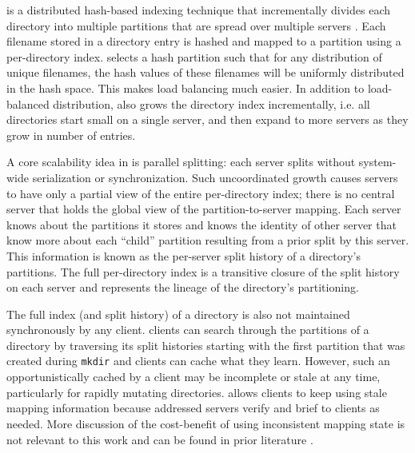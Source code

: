 \giga is a distributed hash-based indexing technique that incrementally
divides each directory into multiple partitions that are spread over multiple
servers \cite{GIGA11}.
Each filename stored in a directory entry is hashed and mapped to a partition
using a per-directory index.
\giga selects a hash partition such that for any distribution of unique filenames,
the hash values of these filenames will be uniformly distributed in the hash space.
This makes load balancing much easier.
In addition to load-balanced distribution, \giga also grows the directory
index incrementally, i.e. all directories start small on a single server, and
then expand to more servers as they grow in number of entries.

A core scalability idea in \giga is parallel splitting: each server splits
without system-wide serialization or synchronization.
Such uncoordinated growth causes \giga servers to have only a partial view of
the entire per-directory index;
there is no central server that holds the global view of the
partition-to-server mapping.
Each server knows about the partitions it stores and knows the
identity of other server that know more about each ``child'' partition
resulting from a prior split by this server.
This information is known as the per-server split history of
a directory's partitions.
The full per-directory \giga index is
a transitive closure of the split history on each
server and represents the lineage of the directory's partitioning.

The full index (and split history) of a directory
is also not maintained synchronously by any client.
\giga clients can search through the partitions of a directory by traversing
its split histories starting with the first partition that was created during
\texttt{mkdir} and clients can cache what they learn.
However, such an opportunistically cached by a client may be
incomplete or stale at any time, particularly for rapidly mutating directories.
\giga allows clients to keep using stale mapping information
because addressed servers verify and brief to clients as needed.
More discussion of the cost-benefit of using
inconsistent mapping state is not relevant to this work and can be found in
prior \giga{} literature \cite{GIGA07, GIGA11}.
